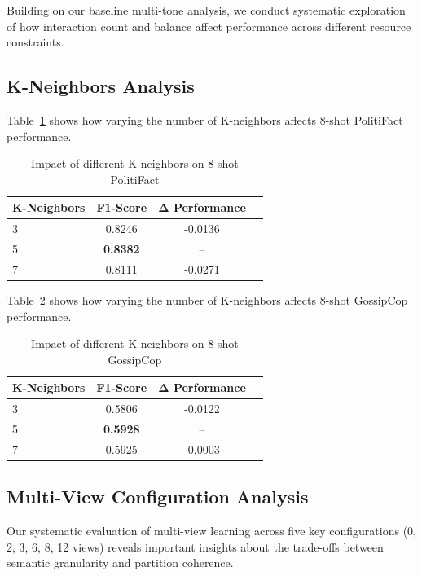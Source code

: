 Building on our baseline multi-tone analysis, we conduct systematic exploration of how interaction count and balance affect performance across different resource constraints.

\subsection{K-Neighbors Analysis}

Table~\ref{tab:hyperparameter_k_neighbors_politifact} shows how varying the number of K-neighbors affects 8-shot PolitiFact performance.

\begin{table}[htbp]
\centering
\caption{Impact of different K-neighbors on 8-shot PolitiFact}
\label{tab:hyperparameter_k_neighbors_politifact}
\begin{tabular}{lccc}
\toprule
\textbf{K-Neighbors} & \textbf{F1-Score} & \textbf{Δ Performance} \\
\midrule
3 & 0.8246 & -0.0136 \\
5 & \textbf{0.8382} & -- \\
7 & 0.8111 & -0.0271 \\
\bottomrule
\end{tabular}
\end{table}


Table~\ref{tab:hyperparameter_k_neighbors_gossipcop} shows how varying the number of K-neighbors affects 8-shot GossipCop performance.

\begin{table}[htbp]
\centering
\caption{Impact of different K-neighbors on 8-shot GossipCop}
\label{tab:hyperparameter_k_neighbors_gossipcop}
\begin{tabular}{lccc}
\toprule
\textbf{K-Neighbors} & \textbf{F1-Score} & \textbf{Δ Performance} \\
\midrule
3 & 0.5806 & -0.0122 \\
5 & \textbf{0.5928} & -- \\
7 & 0.5925 & -0.0003 \\
\bottomrule
\end{tabular}
\end{table}

\subsection{Multi-View Configuration Analysis}

Our systematic evaluation of multi-view learning across five key configurations (0, 2, 3, 6, 8, 12 views) reveals important insights about the trade-offs between semantic granularity and partition coherence.

